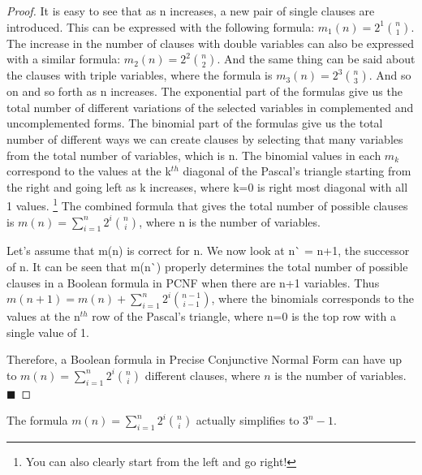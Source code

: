 \documentclass[runningheads,a4paper]{llncs}
\begin{document}
\begin{theorem}
\begin{proof}
It is easy to see that as n increases, a new pair of single clauses are introduced. This can be expressed with the following formula: $m_{1}(n) = 2^1 \binom{n} {1}$. The increase in the number of clauses with double variables can also be expressed with a similar formula: $m_{2}(n) = 2^2 \binom{n} {2}$. And the same thing can be said about the clauses with triple variables, where the formula is $m_{3}(n) = 2^3 \binom{n} {3}$. And so on and so forth as n increases. The exponential part of the formulas give us the total number of different variations of the selected variables in complemented and uncomplemented forms. The binomial part of the formulas give us the total number of different ways we can create clauses by selecting that many variables from the total number of variables, which is n. The binomial values in each $m_{k}$ correspond to the values at the k$^{th}$ diagonal of the Pascal's triangle starting from the right and going left as k increases, where k=0 is right most diagonal with all 1 values. \footnote{You can also clearly start from the left and go right!} The combined formula that gives the total number of possible clauses is $ m(n) = \sum_{i=1}^{n} 2^{i} \binom{n} {i}$, where n is the number of variables.

Let's assume that m(n) is correct for n. We now look at n\`{} = n+1, the successor of n. It can be seen that m(n\`{}) properly determines the total number of possible clauses in a Boolean formula in PCNF when there are n+1 variables. Thus $m(n+1) = m(n) + \sum_{i=1}^{n} 2^{i} \binom{n-1} {i-1}$, where the binomials corresponds to the values at the n$^{th}$ row of the Pascal's triangle, where n=0 is the top row with a single value of 1.

Therefore, a Boolean formula in Precise Conjunctive Normal Form can have up to $ m(n) = \sum_{i=1}^{n} 2^{i} \binom{n} {i}$ different clauses, where $n$ is the number of variables. $\blacksquare$

\end{proof}
\end{theorem}

The formula $ m(n) = \sum_{i=1}^{n} 2^{i} \binom{n} {i}$ actually simplifies to $3^{n}-1$.
\newpage
\end{document}
